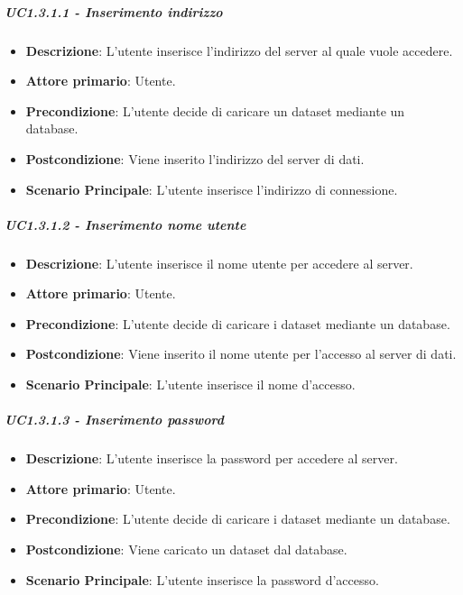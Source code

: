 \subparagraph{UC1.3.1.1 - Inserimento indirizzo}
\label{spar:uc1.3.1.1}
\begin{itemize}
    \item \textbf{Descrizione}: L'utente inserisce l'indirizzo del server al quale vuole accedere.
    \item \textbf{Attore primario}: Utente.    
   
    \item \textbf{Precondizione}:   L'utente decide di caricare un dataset mediante un database.
    \item \textbf{Postcondizione}:  Viene inserito l'indirizzo del server di dati.
    
    \item \textbf{Scenario Principale}: L'utente inserisce l'indirizzo di connessione.

\end{itemize}


\subparagraph{UC1.3.1.2 - Inserimento nome utente}
\label{spar:uc1.3.1.2}
\begin{itemize}
    \item \textbf{Descrizione}: L'utente inserisce il nome utente per accedere al server.
    \item \textbf{Attore primario}: Utente.
    
    \item \textbf{Precondizione}:   L'utente decide di caricare i dataset mediante un database.
    \item \textbf{Postcondizione}:  Viene inserito il nome utente per l'accesso al server di dati.

    \item \textbf{Scenario Principale}: L'utente inserisce il nome d'accesso.
\end{itemize}


\subparagraph{UC1.3.1.3 - Inserimento password}
\label{spar:uc1.3.1.3}
\begin{itemize}
    \item \textbf{Descrizione}: L'utente inserisce la password per accedere al server.
    \item \textbf{Attore primario}: Utente.
    
    \item \textbf{Precondizione}:   L'utente decide di caricare i dataset mediante un database.
    \item \textbf{Postcondizione}:  Viene caricato un dataset dal database.

    \item \textbf{Scenario Principale}: L'utente inserisce la password d'accesso.

\end{itemize}

